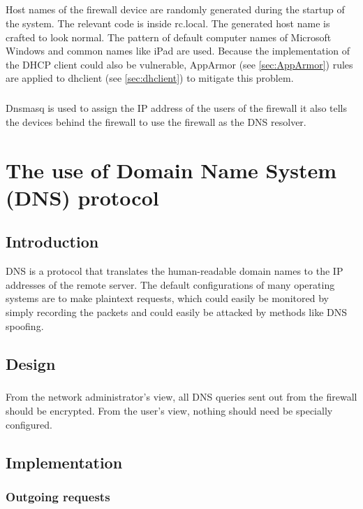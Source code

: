 \documentclass[mscthesis]{usiinfthesis}
\begin{document}
\paragraph{}
Host names of the firewall device are randomly generated during the startup of the system. The relevant code is inside rc.local. The generated host name is crafted to look normal. The pattern of default computer names of Microsoft Windows and common names like iPad are used. Because the implementation of the DHCP client could also be vulnerable, AppArmor (see \cref{sec:AppArmor}) rules are applied to dhclient (see \cref{sec:dhclient}) to mitigate this problem.
\paragraph{}
Dnsmasq is used to assign the IP address of the users of the firewall it also tells the devices behind the firewall to use the firewall as the DNS resolver.

\chapter{The use of Domain Name System (DNS) protocol}\label{cha:dns}

\section{Introduction}
DNS is a protocol that translates the human-readable domain names to the IP addresses of the remote server. The default configurations of many operating systems are to make plaintext requests, which could easily be monitored by simply recording the packets and could easily be attacked by methods like DNS spoofing.

\section{Design}
\paragraph{}
From the network administrator's view, all DNS queries sent out from the firewall should be encrypted. From the user's view, nothing should need be specially configured.

\section{Implementation}
\subsection{Outgoing requests}
\end{document}
